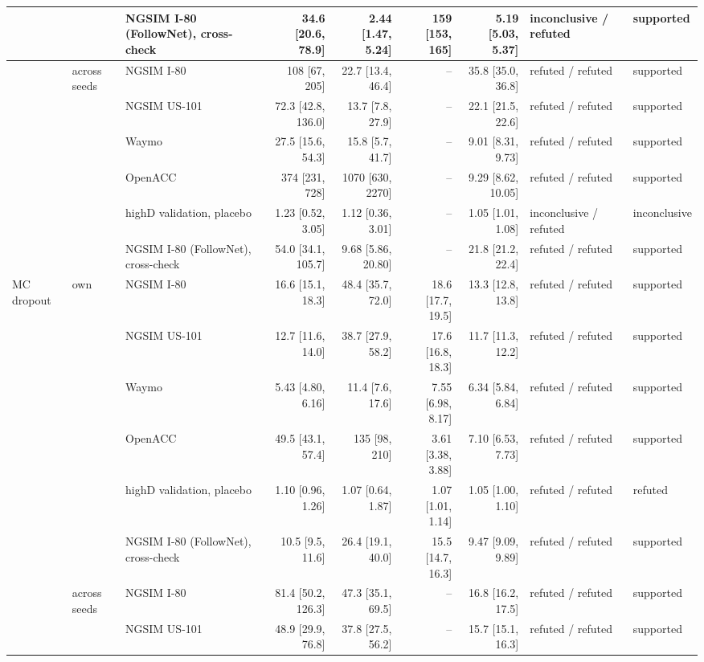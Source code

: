 \begin{longtable}{lllrrrrll}
 &  & NGSIM I-80 (FollowNet), cross-check & 34.6 [20.6, 78.9] & 2.44 [1.47, 5.24] & 159 [153, 165] & 5.19 [5.03, 5.37] & inconclusive / refuted & supported \\
\midrule
 & across seeds & NGSIM I-80 & 108 [67, 205] & 22.7 [13.4, 46.4] & -- & 35.8 [35.0, 36.8] & refuted / refuted & supported \\
 &  & NGSIM US-101 & 72.3 [42.8, 136.0] & 13.7 [7.8, 27.9] & -- & 22.1 [21.5, 22.6] & refuted / refuted & supported \\
 &  & Waymo & 27.5 [15.6, 54.3] & 15.8 [5.7, 41.7] & -- & 9.01 [8.31, 9.73] & refuted / refuted & supported \\
 &  & OpenACC & 374 [231, 728] & 1070 [630, 2270] & -- & 9.29 [8.62, 10.05] & refuted / refuted & supported \\
 &  & highD validation, placebo & 1.23 [0.52, 3.05] & 1.12 [0.36, 3.01] & -- & 1.05 [1.01, 1.08] & inconclusive / refuted & inconclusive \\
 &  & NGSIM I-80 (FollowNet), cross-check & 54.0 [34.1, 105.7] & 9.68 [5.86, 20.80] & -- & 21.8 [21.2, 22.4] & refuted / refuted & supported \\
\midrule
MC dropout & own & NGSIM I-80 & 16.6 [15.1, 18.3] & 48.4 [35.7, 72.0] & 18.6 [17.7, 19.5] & 13.3 [12.8, 13.8] & refuted / refuted & supported \\
 &  & NGSIM US-101 & 12.7 [11.6, 14.0] & 38.7 [27.9, 58.2] & 17.6 [16.8, 18.3] & 11.7 [11.3, 12.2] & refuted / refuted & supported \\
 &  & Waymo & 5.43 [4.80, 6.16] & 11.4 [7.6, 17.6] & 7.55 [6.98, 8.17] & 6.34 [5.84, 6.84] & refuted / refuted & supported \\
 &  & OpenACC & 49.5 [43.1, 57.4] & 135 [98, 210] & 3.61 [3.38, 3.88] & 7.10 [6.53, 7.73] & refuted / refuted & supported \\
 &  & highD validation, placebo & 1.10 [0.96, 1.26] & 1.07 [0.64, 1.87] & 1.07 [1.01, 1.14] & 1.05 [1.00, 1.10] & refuted / refuted & refuted \\
 &  & NGSIM I-80 (FollowNet), cross-check & 10.5 [9.5, 11.6] & 26.4 [19.1, 40.0] & 15.5 [14.7, 16.3] & 9.47 [9.09, 9.89] & refuted / refuted & supported \\
\midrule
 & across seeds & NGSIM I-80 & 81.4 [50.2, 126.3] & 47.3 [35.1, 69.5] & -- & 16.8 [16.2, 17.5] & refuted / refuted & supported \\
 &  & NGSIM US-101 & 48.9 [29.9, 76.8] & 37.8 [27.5, 56.2] & -- & 15.7 [15.1, 16.3] & refuted / refuted & supported \\

\end{longtable}
